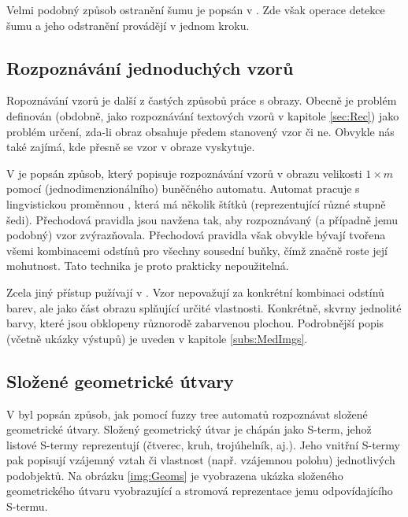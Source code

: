 Velmi podobný způsob ostranění šumu je popsán v \cite{SahUguSah-SalPepNoiFilFuzCelAut}. Zde však operace detekce šumu a jeho odstranění provádějí v jednom kroku.

\subsection{Rozpoznávání jednoduchých vzorů} \label{subs:SimpImgRec}

Ropoznávání vzorů je další z častých způsobů práce s obrazy. Obecně je problém definován (obdobně, jako rozpoznávání textových vzorů v kapitole \ref{sec:Rec}) jako problém určení, zda-li obraz obsahuje předem stanovený vzor či ne. Obvykle nás také zajímá, kde přesně se vzor v obraze vyskytuje.

V \cite{MajCha-FuzCelAutModPatClas} je popsán způsob, který popisuje rozpoznávání vzorů v obrazu velikosti $1 \times m$ pomocí (jednodimenzionálního) buněčného automatu. Automat pracuje s lingvistickou proměnnou , která má několik štítků (reprezentující různé stupně šedi). Přechodová pravidla jsou navžena tak, aby rozpoznávaný (a případně jemu podobný) vzor zvýrazňovala. Přechodová pravidla však obvykle bývají tvořena všemi kombinacemi odstínů pro všechny sousední buňky, čímž značně roste její mohutnost. Tato technika je proto prakticky nepoužitelná.

Zcela jiný přístup pužívají v \cite{WanJiaZhoDu-ImProcBasFuzCelAuMod}. Vzor nepovažují za konkrétní kombinaci odstínů barev, ale jako část obrazu splňující určité vlastnosti. Konkrétně, skvrny jednolité barvy, které jsou obklopeny různorodě zabarvenou plochou. Podrobnější popis (včetně ukázky výstupů) je uveden v kapitole \ref{subs:MedImgs}.

\subsection{Složené geometrické útvary} \label{subs:CompGeoms}

V \cite{Lee-FuzTreAutSynPatRec} byl popsán způsob, jak pomocí fuzzy tree automatů rozpoznávat složené geometrické útvary. Složený geometrický útvar je chápán jako S-term, jehož listové S-termy reprezentují  (čtverec, kruh, trojúhelník, aj.). Jeho vnitřní S-termy pak popisují vzájemný vztah či vlastnost (např. vzájemnou polohu) jednotlivých podobjektů. Na obrázku \ref{img:Geoms} je vyobrazena ukázka složeného geometrického útvaru vyobrazující  a stromová reprezentace jemu odpovídajícího S-termu.

